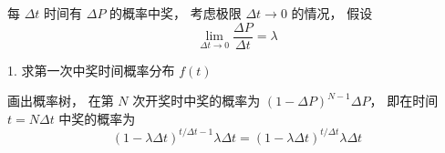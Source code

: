 
每 $\Delta t$ 时间有 $\Delta P$ 的概率中奖， 考虑极限 $\Delta t\to 0$ 的情况， 假设
\begin{equation}
\lim_{\Delta t\to 0}\frac{\Delta P}{\Delta t} = \lambda
\end{equation}


1. 求第一次中奖时间概率分布 $f(t)$

画出概率树， 在第 $N$ 次开奖时中奖的概率为 $(1-\Delta P)^{N-1} \Delta P$， 即在时间 $t = N\Delta t$ 中奖的概率为
\begin{equation}
(1-\lambda\Delta t)^{{t}/{\Delta t}-1} \lambda\Delta t
= (1-\lambda\Delta t)^{{t}/{\Delta t}} \lambda\Delta t
\end{equation}

